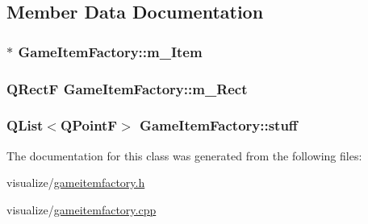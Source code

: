 \subsection{Member Data Documentation}
\hypertarget{class_game_item_factory_a82d2d5b349a64dc7a6c93bd5fbc3d951}{
\subsubsection[{m\_\-Item}]{$\ast$ {\bf GameItemFactory::m\_\-Item}}}
\label{class_game_item_factory_a82d2d5b349a64dc7a6c93bd5fbc3d951}
\hypertarget{class_game_item_factory_a2ea43bf8b59fdc06cbe2e3acc024e1ed}{
\subsubsection[{m\_\-Rect}]{\setlength{\rightskip}{0pt plus 5cm}QRectF {\bf GameItemFactory::m\_\-Rect}}}
\label{class_game_item_factory_a2ea43bf8b59fdc06cbe2e3acc024e1ed}
\hypertarget{class_game_item_factory_add62253288160d01b8db84da9469829c}{
\subsubsection[{stuff}]{\setlength{\rightskip}{0pt plus 5cm}QList$<$QPointF$>$ {\bf GameItemFactory::stuff}}}
\label{class_game_item_factory_add62253288160d01b8db84da9469829c}


The documentation for this class was generated from the following files:\begin{DoxyCompactItemize}
\item 
visualize/\hyperlink{gameitemfactory_8h}{gameitemfactory.h}\item 
visualize/\hyperlink{gameitemfactory_8cpp}{gameitemfactory.cpp}\end{DoxyCompactItemize}
